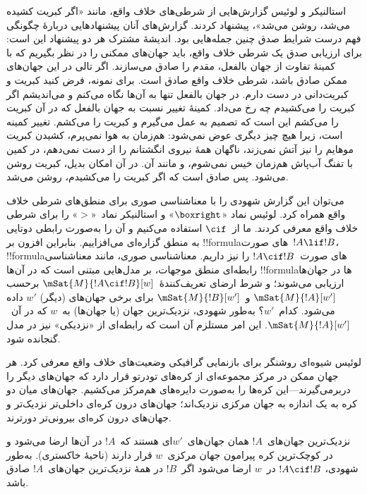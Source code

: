 \documentclass[../../../include/open-logic-section]{subfiles}
\begin{document}


استالنیکر و لوئیس گزارش‌هایی از شرطی‌های خلاف واقع، مانند «اگر کبریت
کشیده می‌شد، روشن می‌شد»، پیشنهاد کردند. گزارش‌های آنان پیشنهادهایی
دربارهٔ چگونگی فهم درست شرایط صدق چنین جمله‌هایی بود. اندیشهٔ مشترک هر
دو پیشنهاد این است: برای ارزیابی صدق یک شرطی خلاف واقع، باید جهان‌های
ممکنی را در نظر بگیریم که با کمینهٔ تفاوت از جهان بالفعل، مقدم را صادق
می‌سازند. اگر تالی در این جهان‌های ممکن صادق باشد، شرطی خلاف واقع صادق
است. برای نمونه، فرض کنید کبریت و کبریت‌دانی در دست دارم. در جهان بالفعل
تنها به آن‌ها نگاه می‌کنم و می‌اندیشم اگر کبریت را می‌کشیدم چه رخ
می‌داد. کمینهٔ تغییر نسبت به جهان بالفعل که در آن کبریت را می‌کشم این
است که تصمیم به عمل می‌گیرم و کبریت را می‌کشم. تغییر کمینه است، زیرا
هیچ چیز دیگری عوض نمی‌شود: هم‌زمان به هوا نمی‌پرم، کشیدن کبریت موهایم
را نیز آتش نمی‌زند، ناگهان همهٔ نیروی انگشتانم را از دست نمی‌دهم، در
کمین با تفنگ آب‌پاش هم‌زمان خیس نمی‌شوم، و مانند آن. در آن امکان بدیل،
کبریت روشن می‌شود. پس صادق است که اگر کبریت را می‌کشیدم، روشن می‌شد.

می‌توان این گزارش شهودی را با معناشناسی صوری برای منطق‌های شرطی خلاف
واقع همراه کرد. لوئیس نماد «$\boxright$» و استالنیکر نماد~«$>$» را برای
شرطی خلاف واقع معرفی کردند. ما از~$\cif$ استفاده می‌کنیم و آن را به‌صورت
رابطی دوتایی به منطق گزاره‌ای می‌افزاییم. بنابراین افزون بر
!!{formula}های صورت~$!A \lif !B$، !!{formula}های صورت~$!A \cif !B$ را
نیز داریم. معناشناسی صوری، مانند معناشناسی رابطه‌ای منطق موجهات، بر
مدل‌هایی مبتنی است که در آن‌ها !!{formula}ها در جهان‌ها ارزیابی
می‌شوند؛ و شرط ارضای تعریف‌کنندهٔ~$\mSat{M}{!A \cif !B}[w]$ برحسب
$\mSat{M}{!A}[w']$ و~$\mSat{M}{!B}[w']$ برای برخی جهان‌های (دیگر)
$w'$ داده می‌شود. کدام~$w'$؟ به‌طور شهودی، نزدیک‌ترین جهان (یا جهان‌ها)
به~$w$ که در آن~$\mSat{M}{!A}[w']$. این امر مستلزم آن است که رابطه‌ای
از «نزدیکی» نیز در مدل گنجانده شود.

لوئیس شیوه‌ای روشنگر برای بازنمایی گرافیکی وضعیت‌های خلاف واقع معرفی
کرد. هر جهان ممکن در مرکز مجموعه‌ای از کره‌های تودرتو قرار دارد که
جهان‌های دیگر را دربرمی‌گیرند---این کره‌ها را به‌صورت دایره‌های هم‌مرکز
می‌کشیم. جهان‌های میان دو کره به یک اندازه به جهان مرکزی نزدیک‌اند؛
جهان‌های درون کره‌ای داخلی‌تر نزدیک‌تر و جهان‌های درون کره‌ای بیرونی‌تر
دورترند.
\begin{center}
\end{center}
نزدیک‌ترین جهان‌های~$!A$ همان جهان‌های~$w'$ای هستند که~$!A$ در آن‌ها
ارضا می‌شود و در کوچک‌ترین کره پیرامون جهان مرکزی~$w$ قرار دارند (ناحیهٔ
خاکستری). به‌طور شهودی، $!A \cif !B$ در~$w$ ارضا می‌شود اگر~$!B$ در
همهٔ نزدیک‌ترین جهان‌های~$!A$ صادق باشد.
\end{document}
